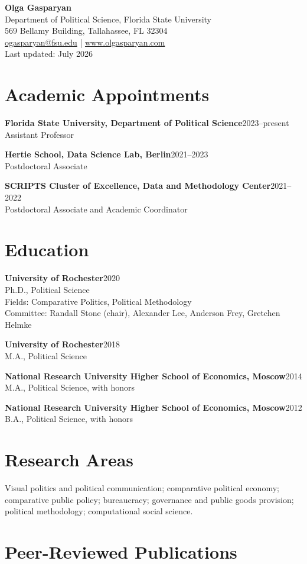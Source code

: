 \documentclass[10pt]{article}
\newcommand{\entry}[2]{\textbf{#1}\hfill #2\\}
\begin{document}
{\LARGE \textbf{Olga Gasparyan}}\\[3pt]
Department of Political Science, Florida State University\\
569 Bellamy Building, Tallahassee, FL 32304\\
\href{mailto:ogasparyan@fsu.edu}{ogasparyan@fsu.edu} \; | \; \href{http://www.olgasparyan.com}{www.olgasparyan.com}\\[-2pt]
\vspace{2pt}
{\small Last updated: July 2026}

\section{Academic Appointments}
\entry{Florida State University, Department of Political Science}{2023--present}
Assistant Professor

\entry{Hertie School, Data Science Lab, Berlin}{2021--2023}
Postdoctoral Associate

\entry{SCRIPTS Cluster of Excellence, Data and Methodology Center}{2021--2022}
Postdoctoral Associate and Academic Coordinator

\section{Education}
\entry{University of Rochester}{2020}
Ph.D., Political Science\\
Fields: Comparative Politics, Political Methodology\\
Committee: Randall Stone (chair), Alexander Lee, Anderson Frey, Gretchen Helmke

\entry{University of Rochester}{2018}
M.A., Political Science

\entry{National Research University Higher School of Economics, Moscow}{2014}
M.A., Political Science, with honors

\entry{National Research University Higher School of Economics, Moscow}{2012}
B.A., Political Science, with honors

\section{Research Areas}
Visual politics and political communication; comparative political economy; comparative public policy; bureaucracy; governance and public goods provision; political methodology; computational social science.

\section{Peer-Reviewed Publications}
\end{document}
